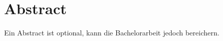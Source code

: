 \section*{Abstract}
\label{sec:abstract}

Ein Abstract ist optional, kann die Bachelorarbeit jedoch bereichern.

\blindtext